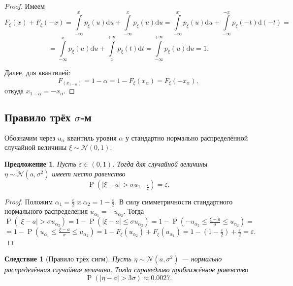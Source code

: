 \documentclass[12pt]{article}
\newtheorem{proposition}[theorem]{Предложение}
\newtheorem{corollary}[theorem]{Следствие}
\numberwithin{theorem}{section}
\theoremstyle{definition}
\newcommand{\prob}{\operatorname{P}}
\newcommand{\diff}{\mathrm{d}}
\begin{document}
	\begin{proof}
		Имеем
		$$ F_\xi(x) + F_\xi(-x) = \int\limits_{-\infty}^{x} p_\xi(u)\diff u +  \int\limits_{-\infty}^{x} p_\xi(u)\diff u
		= \int\limits_{-\infty}^{x} p_\xi(u)\diff u +  \int\limits_{-\infty}^{-x} p_\xi(-t)\diff (-t) = $$ 
		$$ = \int\limits_{-\infty}^{x} p_\xi(u)\diff u +  \int\limits_{x}^{+\infty} p_\xi(t)\diff t 
		= \int\limits_{-\infty}^{+\infty} p_\xi(u)\diff u = 1. $$
		
		Далее, для квантилей:
		$$ F_(x_{1 - \alpha}) = 1 - \alpha = 1 - F_\xi(x_{\alpha}) = F_\xi(-x_{\alpha}), $$
		откуда $ x_{1 - \alpha} = -x_{\alpha} $.
	\end{proof}
	
	\subsection{Правило трёх $ \sigma $-м}
	
	Обозначим через $ u_{\alpha} $ квантиль уровня $ \alpha $ у 
	стандартно нормально распределённой случайной величины $ \xi \sim \mathcal{N}(0, 1) $.
	
	\begin{proposition}
		Пусть $ \varepsilon \in (0, 1) $. Тогда для случайной величины $ \eta \sim \mathcal{N}(a, \sigma^2) $ 
		имеет место равенство
		$$ \prob(|\xi - a| > \sigma u_{1 - \tfrac{\varepsilon}{2}}) = \varepsilon. $$
	\end{proposition}
	
	\begin{proof}
		Положим $ \alpha_1 = \tfrac{\varepsilon}{2} $ и $ \alpha_2 = 1 - \tfrac{\varepsilon}{2} $.
		В силу симметричности стандартного нормального распределения $ u_{\alpha_1} = -u_{\alpha_2} $.
		Тогда
		$$ \prob(|\xi - a| > \sigma u_{\alpha_2}) = 1 - \prob(|\xi - a| \leqslant \sigma u_{\alpha_2})
		= 1 - \prob(-u_{\alpha_2} \leqslant \tfrac{\xi - a}{\sigma} \leqslant u_{\alpha_2}) = $$ 
		$$ = 1 - \prob(u_{\alpha_1} \leqslant \tfrac{\xi - a}{\sigma} \leqslant u_{\alpha_2})
		= 1 - F_{\xi}(u_{\alpha_2}) + F_\xi(u_{\alpha_1}) 
		= 1 - (1 - \tfrac{\varepsilon}{2}) + \tfrac{\varepsilon}{2}
		= \varepsilon. $$
	\end{proof}
	
	\begin{corollary}[Правило трёх сигм]
		Пусть $ \eta \sim \mathcal{N}(a, \sigma^2) $ --- нормально распределённая случайная величина.
		Тогда справедливо приближённое равенство
		$$ \prob(|\eta - a| > 3\sigma) \approx 0.0027. $$
	\end{corollary}
	
\end{document}
